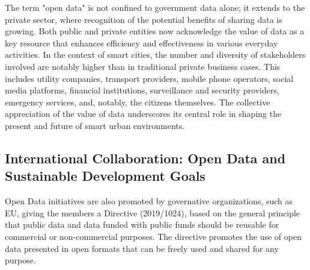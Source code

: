 The term "open data" is not confined to government data alone; it extends to the private sector, where recognition of the potential benefits of sharing data is growing. Both public and private entities now acknowledge the value of data as a key resource that enhances efficiency and effectiveness in various everyday activities. In the context of smart cities, the number and diversity of stakeholders involved are notably higher than in traditional private business cases. This includes utility companies, transport providers, mobile phone operators, social media platforms, financial institutions, surveillance and security providers, emergency services, and, notably, the citizens themselves. The collective appreciation of the value of data underscores its central role in shaping the present and future of smart urban environments.

\subsection{International Collaboration: Open Data and Sustainable Development Goals}
Open Data initiatives are also promoted by governative organizations, such as EU, giving the members a Directive (2019/1024)\cite{EU2019Directive}, based on the general principle that public data and data funded with public funds should be reusable for commercial or non-commercial purposes. The directive promotes the use of open data presented in open formats that can be freely used and shared for any purpose.

